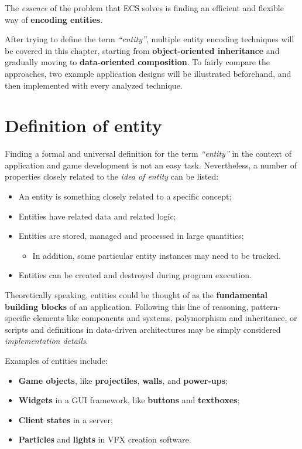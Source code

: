 \documentclass[twoside, 12pt, a4paper, openany]{book}
\providecommand{\tightlist}{%
  \setlength{\itemsep}{0pt}\setlength{\parskip}{0pt}}
\begin{document}
The \emph{essence} of the problem that ECS solves is finding an
efficient and flexible way of \textbf{encoding entities}.

After trying to define the term \emph{``entity''}, multiple entity
encoding techniques will be covered in this chapter, starting from
\textbf{object-oriented inheritance} and gradually moving to
\textbf{data-oriented composition}. To fairly compare the approaches,
two example application designs will be illustrated beforehand, and then
implemented with every analyzed technique.

\section{Definition of entity}\label{definition-of-entity}

Finding a formal and universal definition for the term \emph{``entity''}
in the context of application and game development is not an easy task.
Nevertheless, a number of properties closely related to the \emph{idea
of entity} can be listed:

\begin{itemize}
\item
  An entity is something closely related to a specific concept;
\item
  Entities have related data and related logic;
\item
  Entities are stored, managed and processed in large quantities;

  \begin{itemize}
  \tightlist
  \item
    In addition, some particular entity instances may need to be
    tracked.
  \end{itemize}
\item
  Entities can be created and destroyed during program execution.
\end{itemize}

Theoretically speaking, entities could be thought of as the
\textbf{fundamental building blocks} of an application. Following this
line of reasoning, pattern-specific elements like components and
systems, polymorphism and inheritance, or scripts and definitions in
data-driven architectures may be simply considered \emph{implementation
details}.

Examples of entities include:

\begin{itemize}
\item
  \textbf{Game objects}, like \textbf{projectiles}, \textbf{walls}, and
  \textbf{power-ups};
\item
  \textbf{Widgets} in a GUI framework, like \textbf{buttons} and
  \textbf{textboxes};
\item
  \textbf{Client states} in a server;
\item
  \textbf{Particles} and \textbf{lights} in VFX creation software.
\end{itemize}
\end{document}
